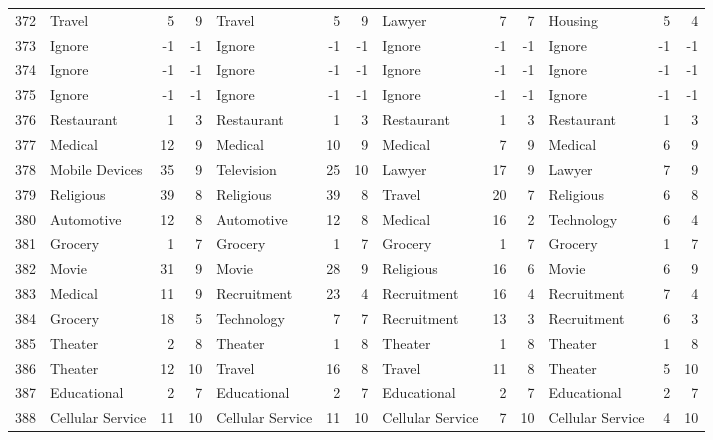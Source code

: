 \begin{figure}[htbp]
\begin{tabular}{rlrrlrrlrrlrr}
    372   & Travel & 5     & 9     & Travel & 5     & 9     & Lawyer & 7     & 7     & Housing & 5     & 4 \\
    373   & Ignore & -1    & -1    & Ignore & -1    & -1    & Ignore & -1    & -1    & Ignore & -1    & -1 \\
    374   & Ignore & -1    & -1    & Ignore & -1    & -1    & Ignore & -1    & -1    & Ignore & -1    & -1 \\
    375   & Ignore & -1    & -1    & Ignore & -1    & -1    & Ignore & -1    & -1    & Ignore & -1    & -1 \\
    376   & Restaurant & 1     & 3     & Restaurant & 1     & 3     & Restaurant & 1     & 3     & Restaurant & 1     & 3 \\
    377   & Medical & 12    & 9     & Medical & 10    & 9     & Medical & 7     & 9     & Medical & 6     & 9 \\
    378   & Mobile Devices & 35    & 9     & Television & 25    & 10    & Lawyer & 17    & 9     & Lawyer & 7     & 9 \\
    379   & Religious & 39    & 8     & Religious & 39    & 8     & Travel & 20    & 7     & Religious & 6     & 8 \\
    380   & Automotive & 12    & 8     & Automotive & 12    & 8     & Medical & 16    & 2     & Technology & 6     & 4 \\
    381   & Grocery & 1     & 7     & Grocery & 1     & 7     & Grocery & 1     & 7     & Grocery & 1     & 7 \\
    382   & Movie & 31    & 9     & Movie & 28    & 9     & Religious & 16    & 6     & Movie & 6     & 9 \\
    383   & Medical & 11    & 9     & Recruitment & 23    & 4     & Recruitment & 16    & 4     & Recruitment & 7     & 4 \\
    384   & Grocery & 18    & 5     & Technology & 7     & 7     & Recruitment & 13    & 3     & Recruitment & 6     & 3 \\
    385   & Theater & 2     & 8     & Theater & 1     & 8     & Theater & 1     & 8     & Theater & 1     & 8 \\
    386   & Theater & 12    & 10    & Travel & 16    & 8     & Travel & 11    & 8     & Theater & 5     & 10 \\
    387   & Educational & 2     & 7     & Educational & 2     & 7     & Educational & 2     & 7     & Educational & 2     & 7 \\
    388   & Cellular Service & 11    & 10    & Cellular Service & 11    & 10    & Cellular Service & 7     & 10    & Cellular Service & 4     & 10 \\

\end{tabular}
\end{figure}
